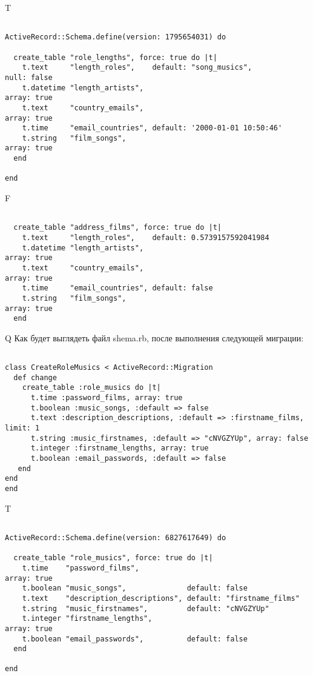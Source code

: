 T
\begin{verbatim}

ActiveRecord::Schema.define(version: 1795654031) do

  create_table "role_lengths", force: true do |t|
    t.text     "length_roles",    default: "song_musics",         null: false
    t.datetime "length_artists",                                               array: true
    t.text     "country_emails",                                               array: true
    t.time     "email_countries", default: '2000-01-01 10:50:46'
    t.string   "film_songs",                                                   array: true
  end

end
\end{verbatim}


F
\begin{verbatim}

  create_table "address_films", force: true do |t|
    t.text     "length_roles",    default: 0.5739157592041984
    t.datetime "length_artists",                                               array: true
    t.text     "country_emails",                                               array: true
    t.time     "email_countries", default: false
    t.string   "film_songs",                                                   array: true
  end

\end{verbatim}

Q
Как будет выглядеть файл shema.rb, после выполнения следующей миграции:

\begin{verbatim}

class CreateRoleMusics < ActiveRecord::Migration 
  def change 
    create_table :role_musics do |t| 
      t.time :password_films, array: true
      t.boolean :music_songs, :default => false
      t.text :description_descriptions, :default => :firstname_films, limit: 1
      t.string :music_firstnames, :default => "cNVGZYUp", array: false
      t.integer :firstname_lengths, array: true
      t.boolean :email_passwords, :default => false
   end
end
end
\end{verbatim}

T
\begin{verbatim}

ActiveRecord::Schema.define(version: 6827617649) do

  create_table "role_musics", force: true do |t|
    t.time    "password_films",                                       array: true
    t.boolean "music_songs",              default: false
    t.text    "description_descriptions", default: "firstname_films"
    t.string  "music_firstnames",         default: "cNVGZYUp"
    t.integer "firstname_lengths",                                    array: true
    t.boolean "email_passwords",          default: false
  end

end
\end{verbatim}


